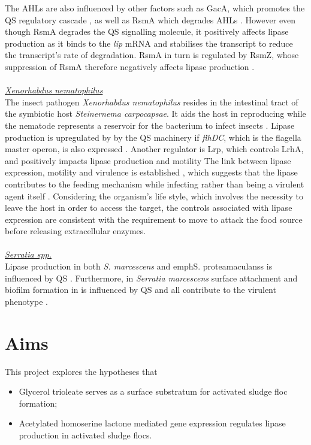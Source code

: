 \documentclass{article}
\begin{document}
The AHLs are also influenced by other factors such as GacA, which promotes the QS regulatory cascade \cite{reimmann1997}, as well as RsmA which degrades AHLs \cite{pessi2001}. However even though RsmA degrades the QS signalling molecule, it positively affects lipase production as it binds to the \textit{lip} mRNA and stabilises the transcript to reduce the transcript's rate of degradation. RsmA in turn is regulated by RsmZ, whose suppression of RsmA therefore negatively affects lipase production \cite{heurlier2004}. 
\\
\\ \emph{\underline{Xenorhabdus nematophilus}} 
\\The insect pathogen \emph{Xenorhabdus nematophilus} resides in the intestinal tract of the symbiotic host \emph{Steinernema carpocapsae}. It aids the host in reproducing while the nematode represents a reservoir for the bacterium to infect insects \cite{herbert2007}. Lipase production is upregulated by  by the QS machinery \cite{dunphy_97} if \emph{flhDC}, which is the flagella master operon, is also expressed \cite{rosenau2000}. Another regulator is Lrp, which controls LrhA, and positively impacts lipase production and motility \cite{richards2008} 
The link between lipase expression, motility and virulence is established \cite{givaudan_00}, which suggests that the lipase contributes to the feeding mechanism while infecting rather than being a virulent agent itself \cite{richards2010}. Considering the organism's life style, which involves the necessity to leave the host in order to access the target, the controls associated with lipase expression are consistent with the requirement to move to attack the food source before releasing extracellular enzymes.
\\
\\ \emph{\underline{Serratia spp.}} 
\\Lipase production in both \emph{S. marcescens} and emph{S. proteamaculanss} is influenced by QS \cite{horng2002,shibatani2000,christensen_03}. Furthermore, in \emph{Serratia marcescens} surface attachment and biofilm formation in  is influenced by QS \cite{labbate2007} and all contribute to the virulent phenotype \cite{hejazi_97}.

\newpage
\section{Aims}
This project explores the hypotheses that 
\begin{itemize}
\item Glycerol trioleate serves as a surface substratum for activated sludge floc formation;
\item Acetylated homoserine lactone mediated gene expression regulates lipase production in activated sludge flocs.
\end{itemize}
\end{document}
